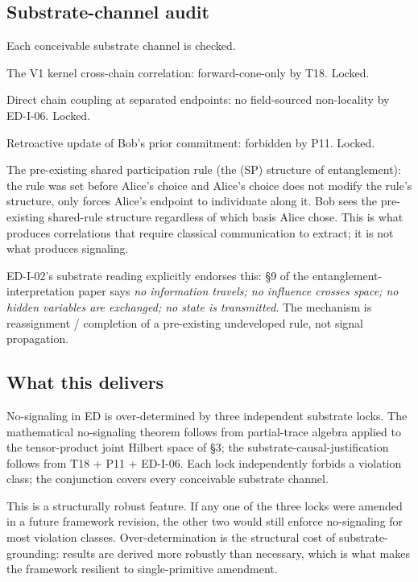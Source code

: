 \documentclass[11pt,a4paper]{article}
\begin{document}
\subsection{Substrate-channel audit}

Each conceivable substrate channel is checked.

The V1 kernel cross-chain correlation: forward-cone-only by T18. Locked.

Direct chain coupling at separated endpoints: no field-sourced non-locality by ED-I-06. Locked.

Retroactive update of Bob's prior commitment: forbidden by P11. Locked.

The pre-existing shared participation rule (the (SP) structure of entanglement): the rule was set before Alice's choice and Alice's choice does not modify the rule's structure, only forces Alice's endpoint to individuate along it. Bob sees the pre-existing shared-rule structure regardless of which basis Alice chose. This is what produces correlations that require classical communication to extract; it is not what produces signaling.

ED-I-02's substrate reading explicitly endorses this: \S9 of the entanglement-interpretation paper says \emph{no information travels; no influence crosses space; no hidden variables are exchanged; no state is transmitted}. The mechanism is reassignment / completion of a pre-existing undeveloped rule, not signal propagation.

\subsection{What this delivers}

No-signaling in ED is over-determined by three independent substrate locks. The mathematical no-signaling theorem follows from partial-trace algebra applied to the tensor-product joint Hilbert space of \S3; the substrate-causal-justification follows from T18 + P11 + ED-I-06. Each lock independently forbids a violation class; the conjunction covers every conceivable substrate channel.

This is a structurally robust feature. If any one of the three locks were amended in a future framework revision, the other two would still enforce no-signaling for most violation classes. Over-determination is the structural cost of substrate-grounding: results are derived more robustly than necessary, which is what makes the framework resilient to single-primitive amendment.
\end{document}
